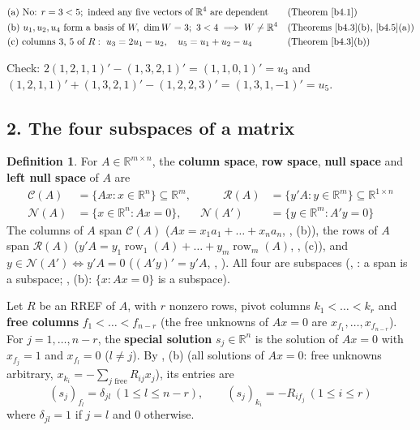 \documentclass[12pt]{article}
\newcommand{\R}{\mathbb R}
\theoremstyle{definition}
\newtheorem{definition}[theorem]{Definition}
\newcommand{\boardtop}{\vspace*{-\abovedisplayskip}}
\DeclareMathOperator{\row}{row}
\begin{document}
\begin{board}[\(r=3\), pivot columns \(k_1=1\), \(k_2=2\), \(k_3=4\):]
\boardtop
\begin{align*}
&\text{(a) No: }r=3<5;\ \text{indeed any five vectors of }\R^4\text{ are dependent}&&\text{(Theorem~\ref{b4.1})}\\
&\text{(b) }u_1,u_2,u_4\text{ form a basis of }W,\ \dim W=3;\ 3<4\implies W\ne\R^4
&&\text{(Theorems~\ref{b4.3}(b), \ref{b4.5}(a))}\\
&\text{(c) columns \(3\), \(5\) of \(R\)}:\ u_3=2u_1-u_2,\quad u_5=u_1+u_2-u_4&&\text{(Theorem~\ref{b4.3}(b))}
\end{align*}
\end{board}
Check: \(2(1,2,1,1)'-(1,3,2,1)'=(1,1,0,1)'=u_3\) and \((1,2,1,1)'+(1,3,2,1)'-(1,2,2,3)'=(1,3,1,-1)'=u_5\).

\subsection*{2. The four subspaces of a matrix}

\begin{definition}\label{b4.7}
For \(A\in\R^{m\times n}\), the \textbf{column space}, \textbf{row space}, \textbf{null space} and \textbf{left null
space} of \(A\) are
\[
\begin{aligned}
\mathcal C(A)&=\{Ax:x\in\R^n\}\subseteq\R^m,&\qquad\mathcal R(A)&=\{y'A:y\in\R^m\}\subseteq\R^{1\times n}\\
\mathcal N(A)&=\{x\in\R^n:Ax=0\},&\mathcal N(A')&=\{y\in\R^m:A'y=0\}
\end{aligned}
\]
The columns of \(A\) span \(\mathcal C(A)\) (\(Ax=x_1a_1+\dots+x_na_n\), , (b)), the rows of
\(A\) span \(\mathcal R(A)\) (\(y'A=y_1\row_1(A)+\dots+y_m\row_m(A)\), , (c)), and
\(y\in\mathcal N(A')\iff y'A=0\) (\((A'y)'=y'A\), , ). All four are subspaces (, : a span is a subspace; , (b):
\(\{x:Ax=0\}\) is a subspace).
\end{definition}
Let \(R\) be an RREF of \(A\), with \(r\) nonzero rows, pivot columns \(k_1<\dots<k_r\) and \textbf{free columns}
\(f_1<\dots<f_{n-r}\) (the free unknowns of \(Ax=0\) are \(x_{f_1},\dots,x_{f_{n-r}}\)). For \(j=1,\dots,n-r\), the
\textbf{special solution} \(s_j\in\R^n\) is the solution of \(Ax=0\) with \(x_{f_j}=1\) and \(x_{f_l}=0\) (\(l\ne j\)).
By , (b) (all solutions of \(Ax=0\): free unknowns arbitrary,
\(x_{k_i}=-\sum_{j\text{ free}}R_{ij}x_j\)), its entries are
\[
(s_j)_{f_l}=\delta_{jl}\ (1\leqslant l\leqslant n-r),\qquad(s_j)_{k_i}=-R_{if_j}\ (1\leqslant i\leqslant r)
\]
where \(\delta_{jl}=1\) if \(j=l\) and \(0\) otherwise.
\end{document}
